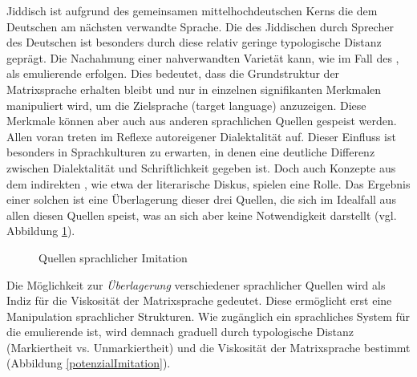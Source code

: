 \noindent Jiddisch ist aufgrund des gemeinsamen mittelhochdeutschen Kerns die dem Deutschen am nächsten verwandte Sprache. Die  des Jiddischen durch Sprecher des Deutschen ist besonders durch diese relativ geringe typologische Distanz geprägt. Die Nachahmung einer nahverwandten Varietät  kann, wie im Fall des \hai{{\LiJi}}, als emulierende  erfolgen. Dies bedeutet, dass die Grundstruktur der Matrixsprache erhalten bleibt und nur in einzelnen signifikanten Merkmalen manipuliert wird, um die Zielsprache (target language) anzuzeigen. Diese Merkmale können aber auch aus anderen sprachlichen Quellen gespeist werden. Allen voran treten im \hai{{\LiJi}} Reflexe autoreigener Dialektalität auf. Dieser Einfluss ist besonders in Sprachkulturen zu erwarten, in denen eine deutliche Differenz zwischen Dialektalität und Schriftlichkeit gegeben ist. Doch auch Konzepte aus dem indirekten , wie etwa der literarische Diskus, spielen eine Rolle. Das Ergebnis einer solchen  ist eine Überlagerung dieser drei Quellen, die sich im Idealfall aus allen diesen Quellen speist, was an sich aber keine Notwendigkeit darstellt (vgl.\, Abbildung \ref{subtraktiveFarbmischung}). 

  \begin{figure}[htbp]
  \farbgrafik %
 \begin{center}
              \caption{Quellen sprachlicher Imitation}\label{subtraktiveFarbmischung}	
\end{center}
 \end{figure}

 

\noindent Die Möglichkeit zur \textit{Überlagerung} verschiedener sprachlicher Quellen wird als Indiz für die Viskosität der Matrixsprache gedeutet. Diese ermöglicht erst eine Manipulation sprachlicher Strukturen. Wie zugänglich ein sprachliches System für die emulierende  ist, wird demnach graduell durch typologische Distanz (Markiertheit vs. Unmarkiertheit) und die Viskosität der Matrixsprache bestimmt (Abbildung \ref{potenzialImitation}). 


